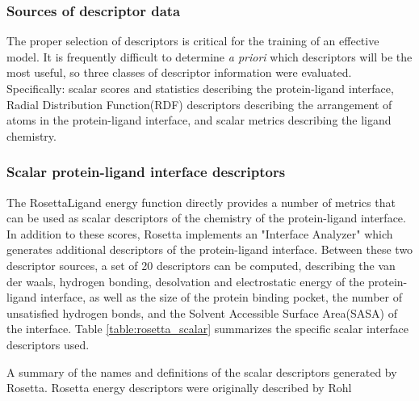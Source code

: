 \subsubsection{Sources of descriptor data} 

The proper selection of descriptors is critical for the training of an effective model.
It is frequently difficult to determine \textit{a priori} which descriptors will be the most useful, so three classes of descriptor information were evaluated.  Specifically: scalar scores and statistics describing the protein-ligand interface,  Radial Distribution Function(RDF) descriptors describing the arrangement of atoms in the protein-ligand interface, and scalar metrics describing the ligand chemistry.

\subsubsection{Scalar protein-ligand interface descriptors}
\label{subsubsec:scalar_rosetta}
The RosettaLigand energy function directly provides a number of metrics that can be used as scalar descriptors of the chemistry of the protein-ligand interface.
In addition to these scores, Rosetta implements an "Interface Analyzer" which generates additional descriptors of the protein-ligand interface.
Between these two descriptor sources, a set of 20 descriptors can be computed, describing the van der waals, hydrogen bonding, desolvation and electrostatic energy of the protein-ligand interface, as well as the size of the protein binding pocket, the number of unsatisfied hydrogen bonds, and the Solvent Accessible Surface Area(SASA) of the interface.
Table \ref{table:rosetta_scalar} summarizes the specific scalar interface descriptors used.
\begin{table}
\scriptsize
\renewcommand{\tabcolsep}{0.09cm}
\centering

\caption{A summary of the names and definitions of the scalar descriptors generated by Rosetta.
Rosetta energy descriptors were originally described by Rohl\citep{Rohl:2004dh} }
\label{table:rosetta_scalar}
\end{table}

